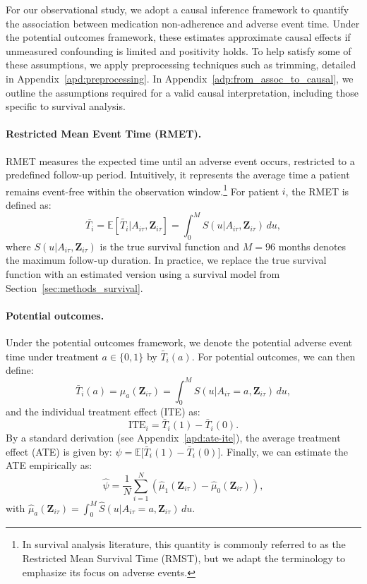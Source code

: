 For our observational study, we adopt a causal inference framework to quantify the association between medication non-adherence and adverse event time.
Under the potential outcomes framework, these estimates approximate causal effects if unmeasured confounding is limited and positivity holds.
To help satisfy some of these assumptions, we apply preprocessing techniques such as trimming, detailed in Appendix~\ref{apd:preprocessing}.
In Appendix~\ref{adp:from_assoc_to_causal}, we outline the assumptions required for a valid causal interpretation, including those specific to survival analysis.

\paragraph{Restricted Mean Event Time (RMET).}  
RMET measures the expected time until an adverse event occurs, restricted to a predefined follow-up period.
Intuitively, it represents the average time a patient remains event-free within the observation window.\footnote{In survival analysis literature, this quantity is commonly referred to as the Restricted Mean Survival Time (RMST), but we adapt the terminology to emphasize its focus on adverse events.}
For patient \(i\), the RMET is defined as:
\[
\bar{T_i} = \mathbb{E}[\widetilde{T_i} | A_{i\tau}, \mathbf{Z}_{i\tau}] = \int_{0}^{M} {S}(u | A_{i\tau}, \mathbf{Z}_{i\tau}) \, du,
\]
where \( {S}(u | A_{i\tau}, \mathbf{Z}_{i\tau}) \) is the true survival function and \( M = 96 \) months denotes the maximum follow-up duration. In practice, we replace the true survival function with an estimated version using a survival model from Section~\ref{sec:methods_survival}.

\paragraph{Potential outcomes.} 
Under the potential outcomes framework, we denote the potential adverse event time under treatment \(a \in \{0,1\}\) by \(\widetilde{T_i}(a)\).
For potential outcomes, we can then define:
\[
\bar{T}_i(a) = \mu_a(\mathbf{Z}_{i\tau}) =\int_{0}^{M} S(u | A_{i\tau} = a, \mathbf{Z}_{i\tau})\, du,
\]
and the individual treatment effect (ITE) as:
\[
\text{ITE}_i = \bar{T}_i(1) - \bar{T}_i(0).
\]
By a standard derivation (see Appendix~\ref{apd:ate-ite}), the average treatment effect (ATE) is given by:
\(
\psi = \mathbb{E}\big[\bar{T}_i(1) - \bar{T}_i(0)\big].
\)
Finally, we can estimate the ATE empirically as:
\[
\widehat{\psi} = \frac{1}{N} \sum_{i=1}^{N}\left(\widehat{\mu}_1(\mathbf{Z}_{i\tau}) - \widehat{\mu}_0(\mathbf{Z}_{i\tau})\right),
\]
with
\(
\widehat{\mu}_a(\mathbf{Z}_{i\tau}) = \int_{0}^{M} \widehat{S}(u | A_{i\tau} = a, \mathbf{Z}_{i\tau})\, du.
\)

